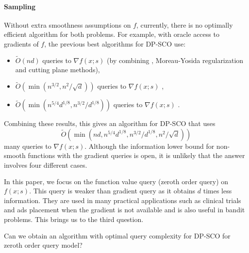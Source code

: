 \paragraph{Sampling} Without extra smoothness assumptions on $f$, currently, there is no optimally efficient algorithm for both problems. For example, with oracle access to gradients of $f$, the previous best algorithms for DP-SCO use:
\begin{itemize}
    \item $\widetilde{O}(n d)$ queries to $\nabla f(x;s)$ (by combining \cite{FKT20}, Moreau-Yosida regularization and cutting plane methods),
    \item $\widetilde{O}(\min(n^{3/2},n^{2}/\sqrt{d}))$ queries to $\nabla f(x;s)$ \cite{AFKT21},
    \item $\widetilde{O}(\min(n^{5/4}d^{1/8},n^{3/2}/d^{1/8}))$ queries to $\nabla f(x;s)$ \cite{KLL21}.
\end{itemize}
Combining these results, this gives an algorithm for DP-SCO that uses 
$$\widetilde{O}(\min(nd, n^{5/4}d^{1/8}, n^{3/2}/d^{1/8},n^{2}/\sqrt{d}))$$
many queries to $\nabla f(x;s)$. Although the information lower bound for non-smooth functions with the gradient queries is open, it is unlikely that the answer involves four different cases. 

In this paper, we focus on the function value query (zeroth order query) on $f(x;s)$. This query is weaker than gradient query as it obtains $d$ times less information. They are used in many practical applications such as clinical trials and ads placement when the gradient is not available and is also useful in bandit problems.
This brings us to the third question.

\begin{question}
Can we obtain an algorithm with optimal query complexity for DP-SCO for zeroth order query model?
\end{question}





